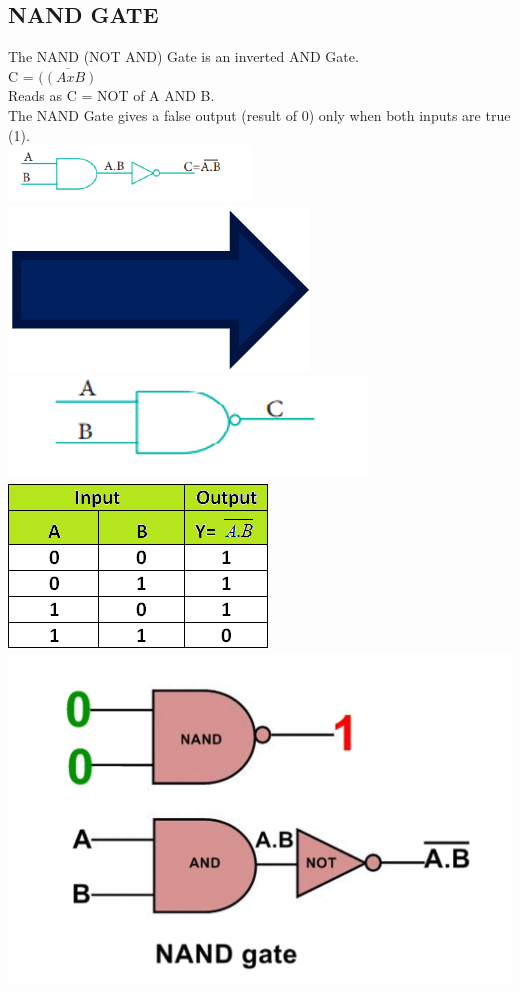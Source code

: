 \documentclass{article}
\begin{document}
\subsection{NAND GATE}
The NAND (NOT AND) Gate is an inverted AND Gate.\\
C = $\overline{((A x B)}$\\
Reads as C = NOT of A AND B.\\
The NAND Gate gives a false output (result of 0) only when both inputs are true (1).\\
\includegraphics[width=0.3\linewidth]{Picture 7.png}\includegraphics[width=0.1\linewidth]{Picture 5.1.png}\includegraphics[width=0.3\linewidth]{Picture 7-1.png}\\
\includegraphics[width=0.5\linewidth]{Unknown-5.png}
\newpage
\includegraphics[width=1.0\linewidth]{Picture}
\newpage
\end{document}

